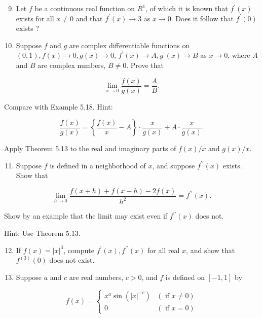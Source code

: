 \documentclass[10pt]{article}
\begin{document}
\begin{enumerate}
  \setcounter{enumi}{8}
  \item Let $f$ be a continuous real function on $R^{1}$, of which it is known that $f^{\prime}(x)$ exists for all $x \neq 0$ and that $f^{\prime}(x) \rightarrow 3$ as $x \rightarrow 0$. Does it follow that $f^{\prime}(0)$ exists ?

  \item Suppose $f$ and $g$ are complex differentiable functions on $(0,1), f(x) \rightarrow 0, g(x) \rightarrow 0$, $f^{\prime}(x) \rightarrow A, g^{\prime}(x) \rightarrow B$ as $x \rightarrow 0$, where $A$ and $B$ are complex numbers, $B \neq 0$. Prove that

\end{enumerate}

$$
\lim _{x \rightarrow 0} \frac{f(x)}{g(x)}=\frac{A}{B} .
$$

Compare with Example 5.18. Hint:

$$
\frac{f(x)}{g(x)}=\left\{\frac{f(x)}{x}-A\right\} \cdot \frac{x}{g(x)}+A \cdot \frac{x}{g(x)} .
$$

Apply Theorem 5.13 to the real and imaginary parts of $f(x) / x$ and $g(x) / x$.

\begin{enumerate}
  \setcounter{enumi}{10}
  \item Suppose $f$ is defined in a neighborhood of $x$, and suppose $f^{\prime \prime}(x)$ exists. Show that
\end{enumerate}

$$
\lim _{h \rightarrow 0} \frac{f(x+h)+f(x-h)-2 f(x)}{h^{2}}=f^{\prime \prime}(x) .
$$

Show by an example that the limit may exist even if $f^{\prime \prime}(x)$ does not.

Hint: Use Theorem 5.13.

\begin{enumerate}
  \setcounter{enumi}{11}
  \item If $f(x)=|x|^{3}$, compute $f^{\prime}(x), f^{\prime \prime}(x)$ for all real $x$, and show that $f^{(3)}(0)$ does not exist.

  \item Suppose $a$ and $c$ are real numbers, $c>0$, and $f$ is defined on $[-1,1]$ by

\end{enumerate}

$$
f(x)= \begin{cases}x^{a} \sin \left(|x|^{-c}\right) & (\text { if } x \neq 0) \\ 0 & (\text { if } x=0)\end{cases}
$$
\end{document}
